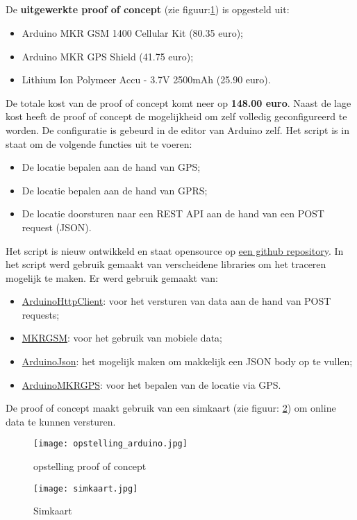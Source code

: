 \subsection{}
De \textbf{uitgewerkte proof of concept} (zie figuur:\ref{fig:opstelling_arduino}) is opgesteld uit:
\begin{itemize}
	\item Arduino MKR GSM 1400 Cellular Kit (80.35 euro);
	\item Arduino MKR GPS Shield (41.75 euro);
	\item Lithium Ion Polymeer Accu - 3.7V 2500mAh (25.90 euro).
\end{itemize}
De totale kost van de proof of concept komt neer op \textbf{148.00 euro}. Naast de lage kost heeft de proof of concept de mogelijkheid om zelf volledig geconfigureerd te worden. De configuratie is gebeurd in de editor van Arduino zelf. Het script is in staat om de volgende functies uit te voeren:
\begin{itemize}
	\item De locatie bepalen aan de hand van GPS;
	\item De locatie bepalen aan de hand van GPRS;
	\item De locatie doorsturen naar een REST API aan de hand van een POST request (JSON).
\end{itemize}
Het script is nieuw ontwikkeld en staat opensource op \href{https://github.com/IndyVC/bap-arduino}{een github repository}. In het script werd gebruik gemaakt van verscheidene libraries om het traceren mogelijk te maken.
Er werd gebruik gemaakt van:
\begin{itemize}
	\item \href{https://github.com/arduino-libraries/ArduinoHttpClient}{ArduinoHttpClient}: voor het versturen van data aan de hand van POST requests;
	\item \href{https://github.com/arduino-libraries/MKRGSM}{MKRGSM}: voor het gebruik van mobiele data;
	\item \href{https://github.com/bblanchon/ArduinoJson}{ArduinoJson}: het mogelijk maken om makkelijk een JSON body op te vullen;
	\item \href{https://github.com/arduino-libraries/Arduino_MKRGPS}{ArduinoMKRGPS}: voor het bepalen van de locatie via GPS.
\end{itemize}
De proof of concept maakt gebruik van een simkaart (zie figuur: \ref{fig:simkaart}) om online data te kunnen versturen. 
\begin{figure}
	\texttt{[image: opstelling\_arduino.jpg]}
	\caption{opstelling proof of concept}
	\label{fig:opstelling_arduino}
\end{figure}
\begin{figure}
	\texttt{[image: simkaart.jpg]}
	\caption{Simkaart}
	\label{fig:simkaart}
\end{figure}

